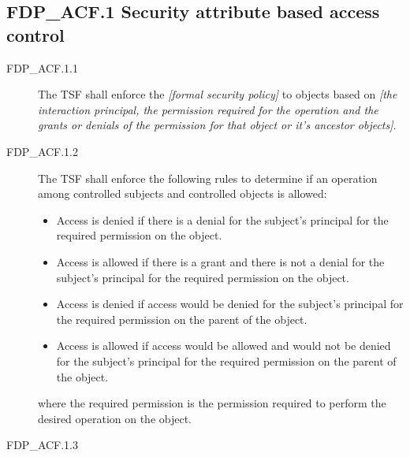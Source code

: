 \documentclass[10pt,a4paper,english]{scrbook}
\begin{document}

\hypertarget{fdp-acf-1-security-attribute-based-access-control}{}
\subsection{FDP{\_}ACF.1 Security attribute based access control}
\begin{description}
\item[FDP{\_}ACF.1.1]

The TSF shall enforce the \emph{{[}formal security policy]} to objects
based on \emph{{[}the interaction principal, the permission required for
the operation and the grants or denials of the permission for that
object or it's ancestor objects]}.

\item[FDP{\_}ACF.1.2]

The TSF shall enforce the following rules to determine
if an operation among controlled subjects and controlled objects is
allowed:
\begin{itemize}
\item {} 
Access is denied if there is a denial for the subject's
principal for the required permission on the object.

\item {} 
Access is allowed if there is a grant and there is not a denial
for the subject's principal for the required permission on the object.

\item {} 
Access is denied if access would be denied for the subject's
principal for the required permission on the parent of the
object.

\item {} 
Access is allowed if access would be allowed and would not be
denied for the subject's principal for the required permission
on the parent of the object.

\end{itemize}

where the required permission is the permission required to
perform the desired operation on the object.

\item[FDP{\_}ACF.1.3]


\end{description}
\end{document}
